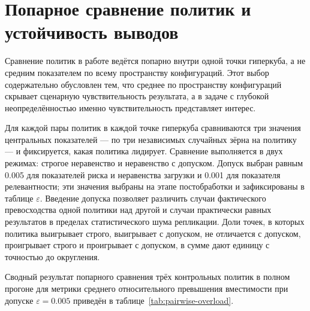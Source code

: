 \section{Попарное сравнение политик и устойчивость выводов}
\label{sec:4-4}

Сравнение политик в работе ведётся попарно внутри одной точки гиперкуба, а не средним показателем по всему пространству конфигураций. Этот выбор содержательно обусловлен тем, что среднее по пространству конфигураций скрывает сценарную чувствительность результата, а в задаче с глубокой неопределённостью именно чувствительность представляет интерес.

Для каждой пары политик в каждой точке гиперкуба сравниваются три значения центральных показателей --- по три независимых случайных зёрна на политику --- и фиксируется, какая политика лидирует. Сравнение выполняется в двух режимах: строгое неравенство и неравенство с допуском. Допуск выбран равным 0.005 для показателей риска и неравенства загрузки и 0.001 для показателя релевантности; эти значения выбраны на этапе постобработки и зафиксированы в таблице $\varepsilon$. Введение допуска позволяет различить случаи фактического превосходства одной политики над другой и случаи практически равных результатов в пределах статистического шума репликации. Доли точек, в которых политика выигрывает строго, выигрывает с допуском, не отличается с допуском, проигрывает строго и проигрывает с допуском, в сумме дают единицу с точностью до округления.

Сводный результат попарного сравнения трёх контрольных политик в полном прогоне для метрики среднего относительного превышения вместимости при допуске $\varepsilon = 0.005$ приведён в таблице~\ref{tab:pairwise-overload}.

